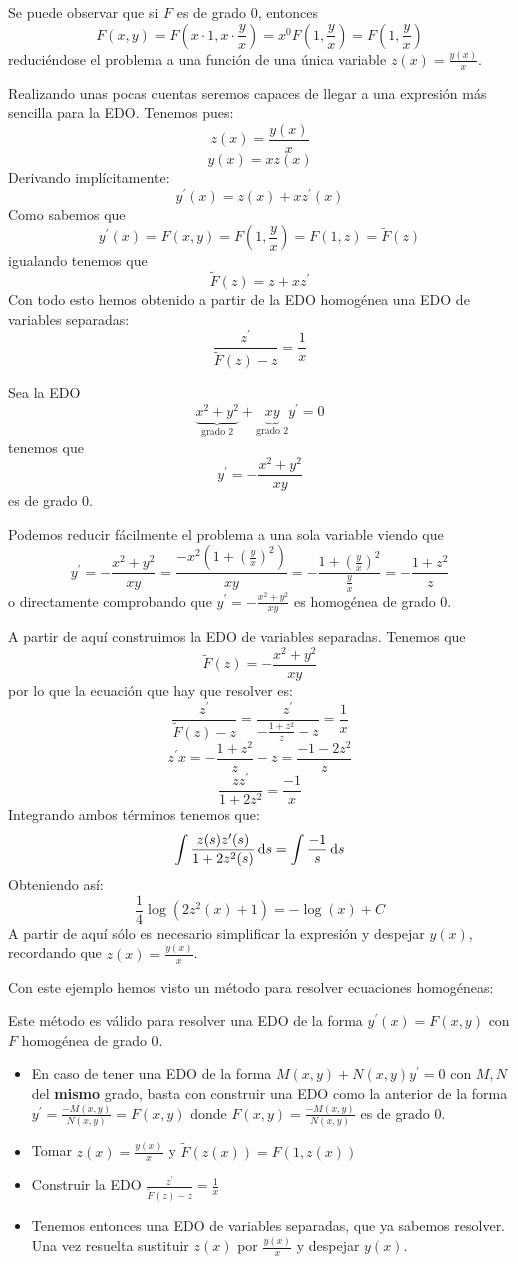 Se puede observar que si $F$ es de grado $0$, entonces
$$F(x,y) = F(x\cdot 1, x\cdot \frac{y}{x}) = x^0 F(1,\frac{y}{x}) = F(1, \frac{y}{x})$$
reduciéndose el problema a una función de una única variable $z(x)=\frac{y(x)}{x}$.

Realizando unas pocas cuentas seremos capaces de llegar a una expresión más sencilla para la EDO.
Tenemos pues:
$$z(x) = \frac{y(x)}{x}$$
$$y(x) = xz(x)$$
Derivando implícitamente:
$$y^\prime(x) = z(x) + xz^\prime(x)$$
Como sabemos que $$y^\prime(x) = F(x,y) = F(1, \frac{y}{x}) = F(1, z) = \tilde{F}(z)$$
igualando tenemos que $$\tilde{F}(z) = z + xz^\prime$$
Con todo esto hemos obtenido a partir de la EDO homogénea una EDO de variables separadas:
$$\frac{z^\prime}{\tilde{F}(z)-z} = \frac{1}{x}$$

\begin{example}
Sea la EDO $$\underbrace{x^2+y^2}_\text{grado 2} + \underbrace{xy}_\text{grado 2}y^\prime = 0$$ tenemos que $$y^\prime = -\frac{x^2+y^2}{xy}$$ es de grado $0$.

Podemos reducir fácilmente el problema a una sola variable viendo que
$$y^\prime = -\frac{x^2+y^2}{xy} = \frac{-x^2(1+(\frac{y}{x})^2)}{xy} = -\frac{1+(\frac{y}{x})^2}{\frac{y}{x}} = -\frac{1+z^2}{z}$$
o directamente comprobando que $y^\prime = -\frac{x^2+y^2}{xy}$ es homogénea de grado 0.

A partir de aquí construimos la EDO de variables separadas. Tenemos que $$\tilde{F}(z) = -\frac{x^2+y^2}{xy}$$ por lo que la ecuación que hay que resolver es:
$$\frac{z^\prime}{\tilde{F}(z)-z} = \frac{z^\prime}{-\frac{1+z^2}{z}-z} = \frac{1}{x}$$
$$z^\prime x = -\frac{1+z^2}{z}-z = \frac{-1-2z^2}{z}$$
$$\frac{zz^\prime}{1+2z^2} = \frac{-1}{x}$$
Integrando ambos términos tenemos que:
$$\int \frac{z(s)z^\prime(s)}{1+2z^2(s)}\dif s = \int\frac{-1}{s}\dif s$$
Obteniendo así:
$$\frac{1}{4}\log(2z^2(x)+1) = - \log(x) + C$$
A partir de aquí sólo es necesario simplificar la expresión y despejar $y(x)$, recordando que $z(x) = \frac{y(x)}{x}$.
\end{example}

Con este ejemplo hemos visto un método para resolver ecuaciones homogéneas:
\begin{method}
Este método es válido para resolver una EDO de la forma $y^\prime(x) = F(x,y)$ con $F$ homogénea de grado 0.
\begin{itemize}
\item En caso de tener una EDO de la forma $M(x,y) + N(x,y)y^\prime = 0$ con $M,N$ del \textbf{mismo} grado, basta con construir una EDO como la anterior de la forma $y^\prime = \frac{-M(x,y)}{N(x,y)} = F(x,y)$ donde $F(x,y) = \frac{-M(x,y)}{N(x,y)}$ es de grado 0.

\item Tomar $z(x) = \frac{y(x)}{x}$ y $\tilde{F}(z(x)) = F(1,z(x))$
\item Construir la EDO $\frac{z^\prime}{\tilde{F}(z) - z} = \frac{1}{x}$
\item Tenemos entonces una EDO de variables separadas, que ya sabemos resolver. Una vez resuelta sustituir $z(x)$ por $\frac{y(x)}{x}$ y despejar $y(x)$.
\end{itemize}
\end{method}

